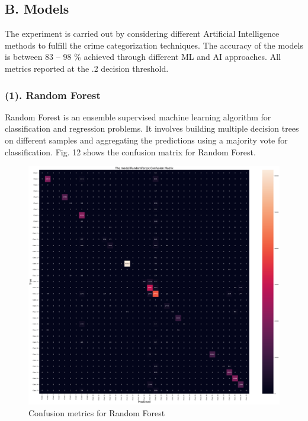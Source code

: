 \documentclass[conference,final, 10pt]{IEEEtran}
\begin{document}
\subsection{B. Models}\label{b.-models}

The experiment is carried out by considering different Artificial
Intelligence methods to fulfill the crime categorization techniques. The
accuracy of the models is between 83 -- 98 \% achieved through different
ML and AI approaches. All metrics reported at the .2 decision threshold.

\subsubsection{(1). Random Forest}\label{random-forest}

Random Forest is an ensemble supervised machine learning algorithm for
classification and regression problems. It involves building multiple
decision trees on different samples and aggregating the predictions
using a majority vote for classification. Fig. 12 shows the confusion
matrix for Random Forest.

\begin{figure}

{\centering \includegraphics[width=0.9\linewidth]{img/fig12} 

}

\caption{Confusion metrics for Random Forest}\label{fig:unnamed-chunk-12}
\end{figure}
\end{document}
